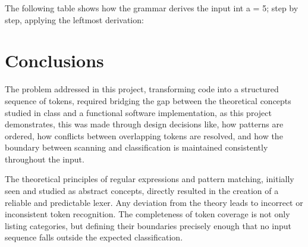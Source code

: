 \documentclass[letterpaper,12pt,oneside]{article}
\begin{document}
The following table shows how the grammar derives the input int a = 5;
step by step, applying the leftmost derivation:

\begin{table}[h]
\centering
{}
\caption{Leftmost derivation of \texttt{int a = 5;}}
\end{table}

\section{Conclusions}

The problem addressed in this project, transforming code into a structured sequence of tokens, required bridging the gap between the theoretical concepts studied in class and a functional software implementation, as this project demonstrates, this was made through design decisions like, how patterns are ordered, how conflicts between overlapping tokens are resolved, and how the boundary between scanning and classification is maintained consistently throughout the input.

The theoretical principles of regular expressions and pattern matching, initially seen and studied as abstract concepts, directly resulted in the creation of a reliable and predictable lexer. Any deviation from the theory leads to incorrect or inconsistent token recognition. The completeness of token coverage is not only  listing categories, but defining their boundaries precisely enough that no input sequence falls outside the expected classification.
\end{document}
